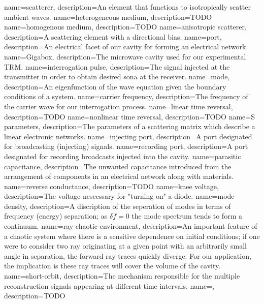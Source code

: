 {
   name=scatterer,
  description={An element that functions to isotropically scatter ambient waves.}
}
{
   name=heterogeneous medium,
  description={TODO}
}
{
   name=homogenous medium,
  description={TODO}
}
{
   name=anisotropic scatterer,
  description={A scattering element with a directional bias.}
}
{
   name=port,
  description={An electrical facet of our cavity for forming an electrical network.}
}
{
   name=Gigabox,
  description={The microwave cavity used for our experimental TRM.}
}
{
   name=interrogation pulse,
  description={The signal injected at the transmitter in order to obtain desired sona at the receiver.}
}
{
   name=mode,
  description={An eigenfunction of the wave equation given the boundary conditions of a system.}
}
{
   name=carrier frequency,
  description={The frequency of the carrier wave for our interrogation process.}
}
{
   name=linear time reversal,
  description={TODO}
}
{
   name=nonlinear time reversal,
  description={TODO}
}
{
   name=S parameters,
  description={The parameters of a scattering matrix which describe a linear electronic networks.}
}
{
   name=injecting port,
  description={A port designated for broadcasting (injecting) signals.}
}
{
   name=recording port,
  description={A port designated for recording broadcasts injected into the cavity.}
}
{
   name=parasitic capacitance,
  description={The unwanted capacitance introduced from the arrangement of components in an electrical network along with materials.}
}
{
   name=reverse conductance,
  description={TODO}
}
{
   name=knee voltage,
  description={The voltage nescessary for "turning on" a diode.}
}
{
   name=mode density,
  description={A discription of the seperation of modes in terms of frequency (energy) separation; as $\delta f = 0$ the mode spectrum tends to form a continuum.}
}
{
   name=ray chaotic environment,
  description={An important feature of a chaotic system where there is a sensitive dependence on initial conditions; if one were to consider two ray originating at a given point with an arbitrarily small angle in separation, the forward ray traces quickly diverge. For our application, the implication is these ray traces will cover the volume of the cavity.}
}
{
   name=short-orbit,
  description={The mechanism responsible for the multiple reconstruction signals appearing at different time intervals. }
}
\newglossaryentry{}
{
   name=,
  description={TODO}
}








